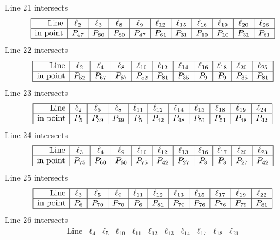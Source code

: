 \documentclass{article}
\begin{document}
{$$$$
Line 21 intersects 
$$
\begin{array}{|r*{10}{|c}|}
\hline
\mbox{Line}  & \ell_{2} & \ell_{3} & \ell_{8} & \ell_{9} & \ell_{12} & \ell_{15} & \ell_{16} & \ell_{19} & \ell_{20} & \ell_{26}\\
\hline
\mbox{in point}  & P_{47} & P_{80} & P_{80} & P_{47} & P_{61} & P_{31} & P_{10} & P_{10} & P_{31} & P_{61}\\
\hline
\end{array}
$$
Line 22 intersects 
$$
\begin{array}{|r*{10}{|c}|}
\hline
\mbox{Line}  & \ell_{2} & \ell_{4} & \ell_{8} & \ell_{10} & \ell_{12} & \ell_{14} & \ell_{16} & \ell_{18} & \ell_{20} & \ell_{25}\\
\hline
\mbox{in point}  & P_{52} & P_{67} & P_{67} & P_{52} & P_{81} & P_{35} & P_{9} & P_{9} & P_{35} & P_{81}\\
\hline
\end{array}
$$
Line 23 intersects 
$$
\begin{array}{|r*{10}{|c}|}
\hline
\mbox{Line}  & \ell_{2} & \ell_{5} & \ell_{8} & \ell_{11} & \ell_{12} & \ell_{14} & \ell_{15} & \ell_{18} & \ell_{19} & \ell_{24}\\
\hline
\mbox{in point}  & P_{5} & P_{39} & P_{39} & P_{5} & P_{42} & P_{48} & P_{51} & P_{51} & P_{48} & P_{42}\\
\hline
\end{array}
$$
Line 24 intersects 
$$
\begin{array}{|r*{10}{|c}|}
\hline
\mbox{Line}  & \ell_{3} & \ell_{4} & \ell_{9} & \ell_{10} & \ell_{12} & \ell_{13} & \ell_{16} & \ell_{17} & \ell_{20} & \ell_{23}\\
\hline
\mbox{in point}  & P_{75} & P_{60} & P_{60} & P_{75} & P_{42} & P_{27} & P_{8} & P_{8} & P_{27} & P_{42}\\
\hline
\end{array}
$$
Line 25 intersects 
$$
\begin{array}{|r*{10}{|c}|}
\hline
\mbox{Line}  & \ell_{3} & \ell_{5} & \ell_{9} & \ell_{11} & \ell_{12} & \ell_{13} & \ell_{15} & \ell_{17} & \ell_{19} & \ell_{22}\\
\hline
\mbox{in point}  & P_{6} & P_{70} & P_{70} & P_{6} & P_{81} & P_{79} & P_{76} & P_{76} & P_{79} & P_{81}\\
\hline
\end{array}
$$
Line 26 intersects 
$$
\begin{array}{|r*{10}{|c}|}
\hline
\mbox{Line}  & \ell_{4} & \ell_{5} & \ell_{10} & \ell_{11} & \ell_{12} & \ell_{13} & \ell_{14} & \ell_{17} & \ell_{18} & \ell_{21}\\

\end{array}$$}
\end{document}
